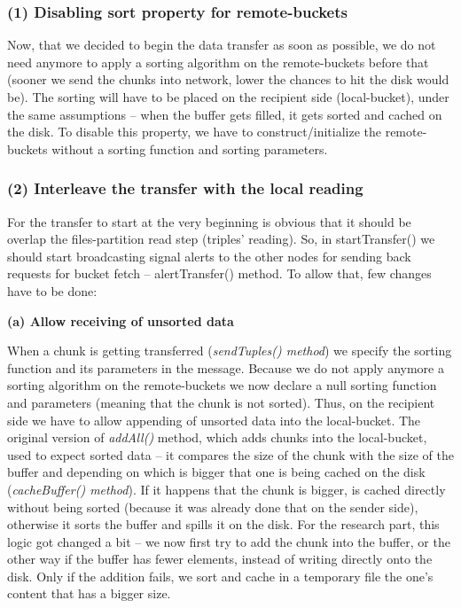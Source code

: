 % 
\subsubsection*{(1) Disabling sort property for remote-buckets}

Now, that we decided to begin the data transfer as soon as possible, we do not need anymore to apply a sorting algorithm on the remote-buckets before that (sooner we send the chunks into network, lower the chances to hit the disk would be). The sorting will have to be placed on the recipient side (local-bucket), under the same assumptions -- when the buffer gets filled, it gets sorted and cached on the disk. To disable this property, we have to construct/initialize the remote-buckets without a sorting function and sorting parameters.

% 
\subsubsection*{(2) Interleave the transfer with the local reading}

For the transfer to start at the very beginning is obvious that it should be overlap the files-partition read step (triples' reading). So, in startTransfer() we should start broadcasting signal alerts to the other nodes for sending back requests for bucket fetch -- alertTransfer() method. To allow that, few changes have to be done:

\textbf{(a) Allow receiving of unsorted data}

When a chunk is getting transferred (\textit{sendTuples() method}) we specify the sorting function and its parameters in the message. Because we do not apply anymore a sorting algorithm on the remote-buckets we now declare a null sorting function and parameters (meaning that the chunk is not sorted). Thus, on the recipient side we have to allow appending of unsorted data into the local-bucket. The original version of \textit{addAll()} method, which adds chunks into the local-bucket, used to expect sorted data -- it compares the size of the chunk with the size of the buffer and depending on which is bigger that one is being cached on the disk (\textit{cacheBuffer() method}). If it happens that the chunk is bigger, is cached directly without being sorted (because it was already done that on the sender side), otherwise it sorts the buffer and spills it on the disk. For the research part, this logic got changed a bit -- we now first try to add the chunk into the buffer, or the other way if the buffer has fewer elements, instead of writing directly onto the disk. Only if the addition fails, we sort and cache in a temporary file the one's content that has a bigger size.

